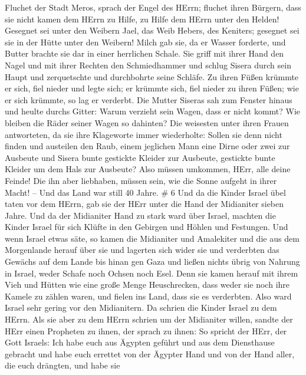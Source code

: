  Fluchet der Stadt Meros, sprach der Engel des HErrn;
fluchet ihren Bürgern, dass sie nicht kamen dem HErrn zu Hilfe, zu Hilfe
dem HErrn unter den Helden!  Gesegnet sei unter den Weibern
Jael, das Weib Hebers, des Keniters; gesegnet sei sie in der Hütte unter
den Weibern!  Milch gab sie, da er Wasser forderte, und
Butter brachte sie dar in einer herrlichen Schale.  Sie
griff mit ihrer Hand den Nagel und mit ihrer Rechten den Schmiedhammer
und schlug Sisera durch sein Haupt und zerquetschte und durchbohrte
seine Schläfe.  Zu ihren Füßen krümmte er sich, fiel nieder
und legte sich; er krümmte sich, fiel nieder zu ihren Füßen; wie er sich
krümmte, so lag er verderbt.  Die Mutter Siseras sah zum
Fenster hinaus und heulte durchs Gitter: Warum verzieht sein Wagen, dass
er nicht kommt? Wie bleiben die Räder seiner Wagen so dahinten?
 Die weisesten unter ihren Frauen antworteten, da sie ihre
Klageworte immer wiederholte:  Sollen sie denn nicht finden
und austeilen den Raub, einem jeglichen Mann eine Dirne oder zwei zur
Ausbeute und Sisera bunte gestickte Kleider zur Ausbeute, gestickte
bunte Kleider um dem Hals zur Ausbeute?  Also müssen
umkommen, HErr, alle deine Feinde! Die ihn aber liebhaben, müssen sein,
wie die Sonne aufgeht in ihrer Macht! -- Und das Land war still 40
Jahre. \# 6  Und da die Kinder Israel übel taten vor dem
HErrn, gab sie der HErr unter die Hand der Midianiter sieben Jahre.
 Und da der Midianiter Hand zu stark ward über Israel,
machten die Kinder Israel für sich Klüfte in den Gebirgen und Höhlen und
Festungen.  Und wenn Israel etwas säte, so kamen die
Midianiter und Amalekiter und die aus dem Morgenlande herauf über sie
 und lagerten sich wider sie und verderbten das Gewächs auf
dem Lande bis hinan gen Gaza und ließen nichts übrig von Nahrung in
Israel, weder Schafe noch Ochsen noch Esel.  Denn sie kamen
herauf mit ihrem Vieh und Hütten wie eine große Menge Heuschrecken, dass
weder sie noch ihre Kamele zu zählen waren, und fielen ins Land, dass
sie es verderbten.  Also ward Israel sehr gering vor den
Midianitern. Da schrien die Kinder Israel zu dem HErrn.  Als
sie aber zu dem HErrn schrien um der Midianiter willen, 
sandte der HErr einen Propheten zu ihnen, der sprach zu ihnen: So
spricht der HErr, der Gott Israels: Ich habe euch aus Ägypten geführt
und aus dem Diensthause gebracht  und habe euch errettet von
der Ägypter Hand und von der Hand aller, die euch drängten, und habe sie

